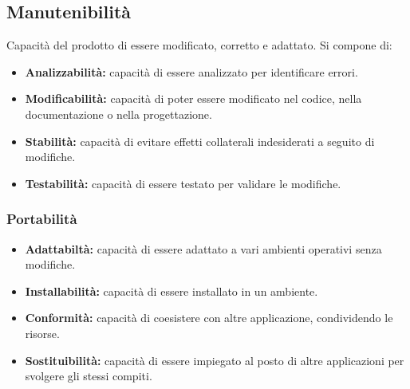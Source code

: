 \subsection{Manutenibilit\`a}
Capacit\`a del prodotto di essere modificato, corretto e adattato. Si compone di:
\begin{itemize}
    \item \textbf{Analizzabilit\`a: }capacit\`a di essere analizzato per identificare errori.
    \item \textbf{Modificabilit\`a: }capacit\`a di poter essere modificato nel codice, nella documentazione o nella progettazione.
    \item \textbf{Stabilit\`a: }capacit\`a di evitare effetti collaterali indesiderati a seguito di modifiche.
    \item \textbf{Testabilit\`a: }capacit\`a di essere testato per validare le modifiche.
\end{itemize}
\subsubsection{Portabilit\`a}
\begin{itemize}
    \item \textbf{Adattabilt\`a: }capacit\`a di essere adattato a vari ambienti operativi senza modifiche.
    \item \textbf{Installabilit\`a: }capacit\`a di essere installato in un ambiente.
    \item \textbf{Conformit\`a: }capacit\`a di coesistere con altre applicazione, condividendo le risorse.
    \item \textbf{Sostituibilit\`a: }capacit\`a di essere impiegato al posto di altre applicazioni per svolgere gli stessi compiti.
\end{itemize}